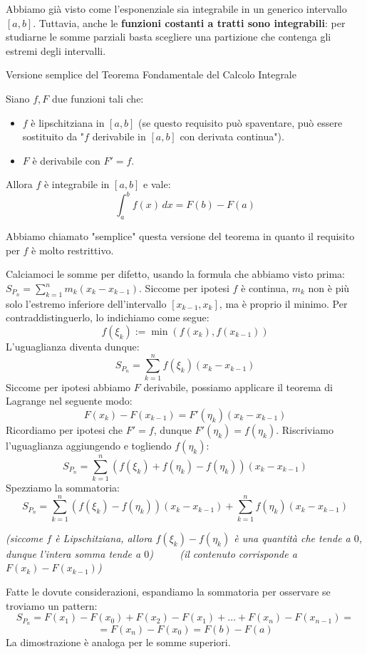 \documentclass[12pt]{report}
\begin{document}
	Abbiamo già visto come l'esponenziale sia integrabile in un generico intervallo $[a, b]$.
	Tuttavia, anche le \textbf{funzioni costanti a tratti sono integrabili}: per studiarne le somme parziali basta scegliere una partizione che contenga gli estremi degli intervalli.
	
	\begin{teorema}{Versione semplice del Teorema Fondamentale del Calcolo Integrale}{}
		
		Siano $f, F$ due funzioni tali che:
		\begin{itemize}
			
			\item $f$ è lipschitziana in $[a, b]$ (se questo requisito può spaventare, può essere sostituito da "$f$ derivabile in $[a, b]$ con derivata continua").
			
			\item $F$ è derivabile con $F' = f$.
			
		\end{itemize}
		Allora $f$ è integrabile in $[a, b]$ e vale:
		\[
		\int_{a}^{b} f(x) \, dx = F(b) - F(a)
		\]
		
	\end{teorema}
	
	Abbiamo chiamato "semplice" questa versione del teorema in quanto il requisito per $f$ è molto restrittivo.
	
	\begin{dimostrazione}{}{}
		Calciamoci le somme per difetto, usando la formula che abbiamo visto prima: $S_{P_n} = \sum_{k=1}^{n} m_k (x_k - x_{k-1})$. Siccome per ipotesi $f$ è continua, $m_k$ non è più solo l'estremo inferiore dell'intervallo $[x_{k-1}, x_k]$, ma è proprio il minimo.
		Per contraddistinguerlo, lo indichiamo come segue:
		\[
		f(\xi_k) := \min(f(x_k), f(x_{k-1}))
		\]
		L'uguaglianza diventa dunque:
		\[
		S_{P_n} = \sum_{k=1}^{n} f(\xi_k) (x_k - x_{k-1})
		\]
		Siccome per ipotesi abbiamo $F$ derivabile, possiamo applicare il teorema di Lagrange nel seguente modo:
		\[
		F(x_k) - F(x_{k-1}) = F'(\eta_k)(x_k - x_{k-1})
		\]
		Ricordiamo per ipotesi che $F' = f$, dunque $F'(\eta_k) = f(\eta_k)$. Riscriviamo l'uguaglianza aggiungendo e togliendo $f(\eta_k)$:
		\[
		S_{P_n} = \sum_{k=1}^{n} \left(f(\xi_k) + f(\eta_k) - f(\eta_k)\right)(x_k - x_{k-1})
		\]
		Spezziamo la sommatoria:
		\[
		S_{P_n} = \sum_{k=1}^{n} (f(\xi_k) - f(\eta_k))(x_k - x_{k-1}) + \sum_{k=1}^{n} f(\eta_k)(x_k - x_{k-1})
		\]
		\begin{center}
			\small
			\textit{(siccome $f$ è Lipschitziana, allora $f(\xi_k) - f(\eta_k)$ è una quantità che tende a $0$, dunque l'intera somma tende a $0$)} $\qquad$ \textit{(il contenuto corrisponde a $F(x_k) - F(x_{k-1})$)}
		\end{center}
		
		Fatte le dovute considerazioni, espandiamo la sommatoria per osservare se troviamo un pattern:
		\[
		S_{P_n} = F(x_1) - F(x_0) + F(x_2) - F(x_1) + \dots + F(x_n) - F(x_{n-1}) = 
		\]
		\[
		= F(x_n) - F(x_0) = F(b) - F(a)
		\]
		La dimostrazione è analoga per le somme superiori.
		
	\end{dimostrazione}
	
\end{document}
